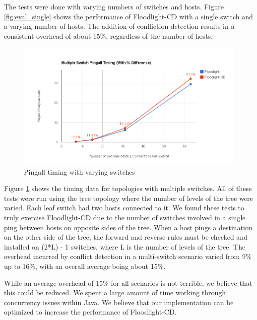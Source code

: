 The tests were done with varying numbers of switches and hosts.
Figure \ref{fig:eval_single} shows the performance of Floodlight-CD with a single switch and a varying number of hosts.
The addition of confliction detection results in a consistent overhead of about 15\%, regardless of the number of hosts.

\begin{figure}[ht!]
	\begin{center}
		\includegraphics[scale=.5]{figs/multiSwitch_eval.png}
		\caption{Pingall timing with varying switches}
		\label{fig:eval_multi}
	\end{center}
\end{figure}

Figure \ref{fig:eval_multi} shows the timing data for topologies with multiple switches.
All of these tests were run using the tree topology where the number of levels of the tree were varied.
Each leaf switch had two hosts connected to it.
We found these tests to truly exercise Floodlight-CD due to the number of switches involved in a single ping between hosts on opposite sides of the tree.
When a host pings a destination on the other side of the tree, the forward and reverse rules must be checked and installed on (2*L) - 1 switches, where L is the number of levels of the tree. 
The overhead incurred by conflict detection in a multi-switch scenario varied from 9\% up to 16\%, with an overall average being about 15\%.

While an average overhead of 15\% for all scenarios is not terrible, we believe that this could be reduced.
We spent a large amount of time working through concurrency issues within Java.
We believe that our implementation can be optimized to increase the performance of Floodlight-CD.

